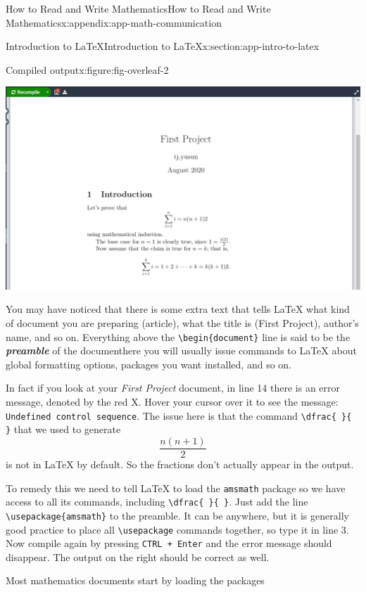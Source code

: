 \documentclass[oneside,10pt,]{book}
\newcommand{\mono}[1]{\texttt{#1}}
\newcommand{\alert}[1]{\textbf{\textit{#1}}}
\numberwithin{equation}{section}
\begin{document}
\begin{appendixptx}{How to Read and Write Mathematics}{}{How to Read and Write Mathematics}{}{}{x:appendix:app-math-communication}
\begin{sectionptx}{Introduction to \LaTeX{}}{}{Introduction to \LaTeX{}}{}{}{x:section:app-intro-to-latex}
\begin{figureptx}{Compiled output}{x:figure:fig-overleaf-2}{}
\begin{image}{0.05}{0.9}{0.05}
\includegraphics[width=\linewidth]{figs/latex-example-overleaf2.png}
\end{image}%
\tcblower
\end{figureptx}%
You may have noticed that there is some extra text that tells \LaTeX{} what kind of document you are preparing (article), what the title is (First Project), author's name, and so on. Everything above the \mono{\textbackslash{}begin\{document\}} line is said to be the \alert{preamble} of the document\textemdash{}here you will usually issue commands to \LaTeX{} about global formatting options, packages you want installed, and so on.%
\par
In fact if you look at your \emph{First Project} document, in line 14 there is an error message, denoted by the red X. Hover your cursor over it to see the message: \mono{Undefined control sequence}. The issue here is that the command \mono{\textbackslash{}dfrac\{ \}\{ \}} that we used to generate%
\begin{equation*}
\dfrac{n(n+1)}{2}
\end{equation*}
is not in \LaTeX{} by default. So the fractions don't actually appear in the output.%
\par
To remedy this we need to tell \LaTeX{} to load the \mono{amsmath} package so we have access to all its commands, including \mono{\textbackslash{}dfrac\{ \}\{ \}}. Just add the line \mono{\textbackslash{}usepackage\{amsmath\}} to the preamble. It can be anywhere, but it is generally good practice to place all \mono{\textbackslash{}usepackage} commands together, so type it in line 3. Now compile again by pressing \mono{CTRL + Enter} and the error message should disappear. The output on the right should be correct as well.%
\par
Most mathematics documents start by loading the packages%
\begin{itemize}[label=\textbullet]

\end{itemize}
\end{sectionptx}
\end{appendixptx}
\end{document}
